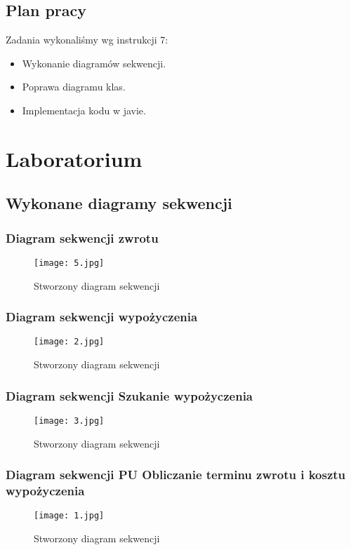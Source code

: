 \documentclass{article}
\begin{document}
	\subsection{Plan pracy}
	Zadania wykonaliśmy wg instrukcji 7:
	\begin{itemize}
		\item Wykonanie diagramów sekwencji.
		\item Poprawa diagramu klas.
		\item Implementacja kodu w javie.
	\end{itemize}
\newpage
\section{Laboratorium}
\subsection{Wykonane diagramy sekwencji}
\subsubsection{Diagram sekwencji zwrotu}
\begin{figure}[!ht]
	\centering
	\texttt{[image: 5.jpg]}
	\caption{Stworzony diagram sekwencji}
	\label{fig:obrazek 1}
	\newpage
\end{figure}
\subsubsection{Diagram sekwencji wypożyczenia}
\begin{figure}[!ht]
	\centering
	\texttt{[image: 2.jpg]}
	\caption{Stworzony diagram sekwencji}
	\label{fig:obrazek 2}
\end{figure}
\newpage
\subsubsection{Diagram sekwencji Szukanie wypożyczenia}
\begin{figure}[!ht]
	\centering
	\texttt{[image: 3.jpg]}
	\caption{Stworzony diagram sekwencji}
	\label{fig:obrazek 3}
\end{figure}
\newpage
\subsubsection{Diagram sekwencji PU Obliczanie terminu zwrotu i kosztu wypożyczenia}
\begin{figure}[!ht]
	\centering
	\texttt{[image: 1.jpg]}
	\caption{Stworzony diagram sekwencji}
	\label{fig:obrazek 4}
\end{figure}
\end{document}
